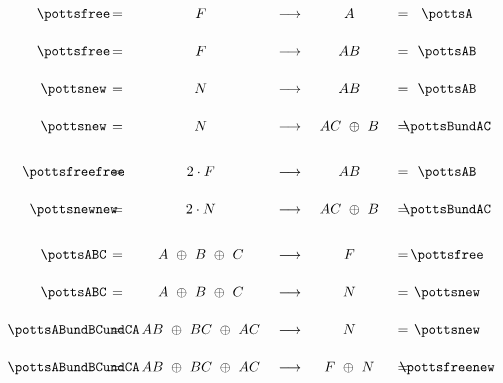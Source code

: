 \begin{equation*}
\renewcommand{\arraystretch}{2}
\begin{array}{ccccccl}
\parbox{1cm}{\makebox[1cm]{{\pottsfree}}} \ & = &\ F\ & \longrightarrow\ & A\ &=&\ \parbox{1cm}{\makebox[1cm]{{\pottsA}}} \\[1mm]
\parbox{1cm}{\makebox[1cm]{{\pottsfree}}} \ & = &\ F\ & \longrightarrow\ & AB\ &=&\ \parbox{1cm}{\makebox[1cm]{{\pottsAB}}}  \\[1mm]
\parbox{1cm}{\makebox[1cm]{{\pottsnew}}} \ & = &\ N \ & \longrightarrow\ & AB\ &=&\ \parbox{1cm}{\makebox[1cm]{{\pottsAB}}}  \\[1mm]
\parbox{1cm}{\makebox[1cm]{{\pottsnew}}} \ & = &\ N \ & \longrightarrow\ & AC\ \oplus\ B\
&=&\ \parbox{1cm}{\makebox[1cm]{{\pottsBundAC}}} \\[3mm]
\parbox{1cm}{\makebox[1cm]{{\pottsfreefree}}} \ &=&\ 2\cdot F\ & \longrightarrow\ & AB\ &=&\ \parbox{1cm}{\makebox[1cm]{{\pottsAB}}}  \\[1mm]
\parbox{1cm}{\makebox[1cm]{{\pottsnewnew}}} \ &=&\ 2\cdot N\ & \longrightarrow\ & AC\ \oplus\ B\
&=&\ \parbox{1cm}{\makebox[1cm]{{\pottsBundAC}}} \\[3mm]
\parbox{1cm}{\makebox[1cm]{{\pottsABC}}} \ & = &\ A\ \oplus\ B\ \oplus\ C\ & \longrightarrow\ & F\ &=&\ \parbox{1cm}{\makebox[1cm]{{\pottsfree}}} \\[1mm]
\parbox{1cm}{\makebox[1cm]{{\pottsABC}}} \ & = &\ A\ \oplus\ B\ \oplus\ C\ & \longrightarrow\ & N\ &=&\ \parbox{1cm}{\makebox[1cm]{{\pottsnew}}} \\[1mm]
\parbox{1cm}{\makebox[1cm]{{\pottsABundBCundCA}}} \ & = &\ AB\ \oplus\ BC\ \oplus\ AC\ &
\longrightarrow\ & N\ &=&\ \parbox{1cm}{\makebox[1cm]{{\pottsnew}}} \\[1mm]
\parbox{1cm}{\makebox[1cm]{{\pottsABundBCundCA}}} \ & = &\ AB\ \oplus\ BC\ \oplus\ AC\ &
\longrightarrow\ & F\ \oplus\ N\ &=&\
\parbox{1cm}{\makebox[1cm]{{\pottsfreenew}}} 
\end{array}
\end{equation*}

